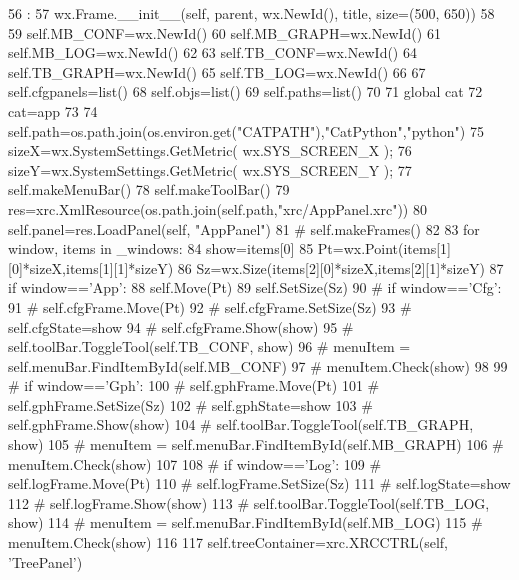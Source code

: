 \begin{DoxyCode}
56                                           : 
57         wx.Frame.__init__(self, parent, wx.NewId(), title, size=(500, 650))
58         
59         self.MB_CONF=wx.NewId()
60         self.MB_GRAPH=wx.NewId()
61         self.MB_LOG=wx.NewId()
62 
63         self.TB_CONF=wx.NewId()
64         self.TB_GRAPH=wx.NewId()
65         self.TB_LOG=wx.NewId()
66 
67         self.cfgpanels=list()
68         self.objs=list()
69         self.paths=list()
70 
71         global cat
72         cat=app
73         
74         self.path=os.path.join(os.environ.get("CATPATH"),"CatPython","python")
75         sizeX=wx.SystemSettings.GetMetric( wx.SYS_SCREEN_X );
76         sizeY=wx.SystemSettings.GetMetric( wx.SYS_SCREEN_Y );
77         self.makeMenuBar()
78         self.makeToolBar()
79         res=xrc.XmlResource(os.path.join(self.path,"xrc/AppPanel.xrc"))
80         self.panel=res.LoadPanel(self, "AppPanel")
81 #        self.makeFrames()
82         
83         for window, items in _windows:
84             show=items[0]
85             Pt=wx.Point(items[1][0]*sizeX,items[1][1]*sizeY)
86             Sz=wx.Size(items[2][0]*sizeX,items[2][1]*sizeY)
87             if window=='App':
88                 self.Move(Pt)
89                 self.SetSize(Sz)
90             # if window=='Cfg':
91             #     self.cfgFrame.Move(Pt)
92             #     self.cfgFrame.SetSize(Sz)
93             #     self.cfgState=show
94             #     self.cfgFrame.Show(show)
95             #     self.toolBar.ToggleTool(self.TB_CONF, show)
96             #     menuItem = self.menuBar.FindItemById(self.MB_CONF)
97             #     menuItem.Check(show) 
98                 
99             # if window=='Gph':
100             #     self.gphFrame.Move(Pt)
101             #     self.gphFrame.SetSize(Sz)
102             #     self.gphState=show
103             #     self.gphFrame.Show(show)
104             #     self.toolBar.ToggleTool(self.TB_GRAPH, show)
105             #     menuItem = self.menuBar.FindItemById(self.MB_GRAPH)
106             #     menuItem.Check(show)
107 
108             # if window=='Log':
109             #     self.logFrame.Move(Pt)
110             #     self.logFrame.SetSize(Sz)
111             #     self.logState=show
112             #     self.logFrame.Show(show)
113             #     self.toolBar.ToggleTool(self.TB_LOG, show)
114             #     menuItem = self.menuBar.FindItemById(self.MB_LOG)
115             #     menuItem.Check(show)
116                 
117         self.treeContainer=xrc.XRCCTRL(self, 'TreePanel')

\end{DoxyCode}
